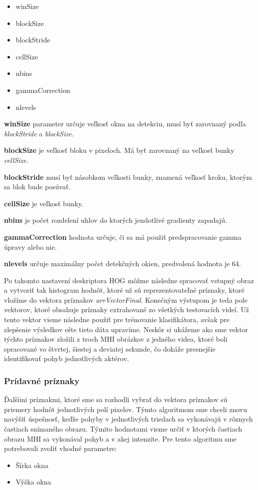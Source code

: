 \begin{itemize}
\item winSize
\item blockSize
\item blockStride
\item cellSize
\item nbins
\item gammaCorrection
\item nlevels 
\end{itemize}

\textbf{winSize} parameter určuje veľkosť okna na detekciu, musí byť zarovnaný podľa \textit{blockStride} a \textit{blockSize}.

\textbf{blockSize} je veľkosť bloku v pixeloch. Má byť zarovnaný na veľkosť bunky \textit{cellSize}.

\textbf{blockStride} musí byť násobkom veľkosti bunky, znamená veľkosť kroku, ktorým sa blok bude posúvať.

\textbf{cellSize} je veľkosť bunky.

\textbf{nbins} je počet rozdelení uhlov do ktorých jendotlivé gradienty zapadajú.

\textbf{gammaCorrection} hodnota určuje, či sa má použiť predspracovanie gamma úpravy alebo nie.

\textbf{nlevels} určuje maximálny počet detekčných okien, predvolená hodnota je 64.

Po takomto nastavení deskriptora HOG môžme následne spracovať vstupný obraz a vytvoriť tak histogram hodnôt, ktoré už sú reprezentovateľné príznaky, ktoré vložíme do vektora príznakov \textit{arrVectorFinal}. Konečným výstupom je teda pole vektorov, ktoré obsahuje príznaky extrahované zo všetkých testovacích videí. Už tento vektor vieme následne použiť pre trénovanie klasifikátora, avšak pre zlepšenie výsledkov ešte tieto dáta upravíme. Neskôr si ukážeme ako sme vektor týchto príznakov zložili z troch MHI obrázkov z jedného videa, ktoré boli spracované vo štvrtej, šiestej a deviatej sekunde, čo dokáže presnejšie identifikovať pohyb jednotlivých aktérov.


\subsubsection{Prídavné príznaky} \label{pridavny}
Ďalšími príznakmi, ktoré sme sa rozhodli vybrať do vektora príznakov sú priemery hodnôt jednotlivých polí pixelov. Týmto algoritmom sme chceli znovu navýšiť úspešnosť, keďže pohyby v jednotlivých triedach sa vykonávajú v rôznych častiach snímaného obrazu. Týmito hodnotami vieme určiť v ktorých častiach obrazu MHI sa vykonával pohyb a v akej intenzite. Pre tento algoritmu sme potrebovali zvoliť vhodné parametre: 
\begin{itemize}
\item Šírka okna
\item Výška okna
\end{itemize}

